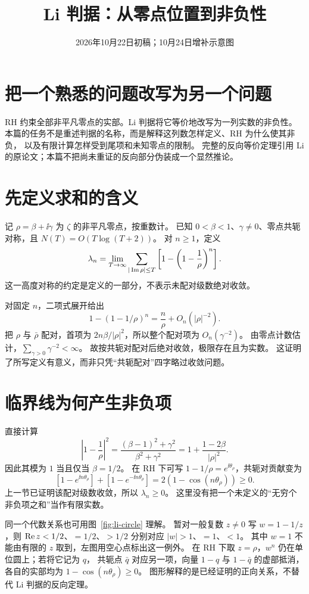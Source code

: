 \documentclass[UTF8,fontset=fandol,11pt]{ctexart}
\date{2026年10月22日初稿；10月24日增补示意图}
\title{Li 判据：从零点位置到非负性}
\begin{document}
\maketitle
\draftnotice
\section{把一个熟悉的问题改写为另一个问题}
RH 约束全部非平凡零点的实部。Li 判据将它等价地改写为一列实数的非负性。
本篇的任务不是重述判据的名称，而是解释这列数怎样定义、RH 为什么使其非负，
以及有限计算怎样受到尾项和未知零点的限制。
完整的反向等价定理引用 Li 的原论文；本篇不把尚未重证的反向部分伪装成一个显然推论。

\section{先定义求和的含义}
记 $\rho=\beta+\ii\gamma$ 为 $\zeta$ 的非平凡零点，按重数计。
已知 $0<\beta<1$、$\gamma\ne0$、零点共轭对称，且 $N(T)=O(T\log(T+2))$。
对 $n\ge1$，定义
\[
 \lambda_n=\lim_{T\to\infty}
 \sum_{|\operatorname{Im}\rho|\le T}
 \left[1-\left(1-\frac1\rho\right)^n\right].
\]
这一高度对称的约定是定义的一部分，不表示未配对级数绝对收敛。

对固定 $n$，二项式展开给出
\[
 1-(1-1/\rho)^n=\frac n\rho+O_n(|\rho|^{-2}).
\]
把 $\rho$ 与 $\bar\rho$ 配对，首项为
$2n\beta/|\rho|^2$，所以整个配对项为 $O_n(\gamma^{-2})$。
由零点计数估计，$\sum_{\gamma>0}\gamma^{-2}<\infty$。
故按共轭对配对后绝对收敛，极限存在且为实数。
这证明了所写定义有意义，而非只凭“共轭配对”四字略过收敛问题。

\section{临界线为何产生非负项}
直接计算
\[
 \left|1-\frac1\rho\right|^2
 =\frac{(\beta-1)^2+\gamma^2}{\beta^2+\gamma^2}
 =1+\frac{1-2\beta}{|\rho|^2}.
\]
因此其模为 $1$ 当且仅当 $\beta=1/2$。
在 RH 下可写 $1-1/\rho=e^{\ii\theta_\rho}$，共轭对贡献变为
\[
 [1-e^{\ii n\theta_\rho}]+[1-e^{-\ii n\theta_\rho}]
 =2(1-\cos(n\theta_\rho))\ge0.
\]
上一节已证明该配对级数收敛，所以 $\lambda_n\ge0$。
这里没有把一个未定义的“无穷个非负项之和”当作有限实数。

\begin{samepage}
同一个代数关系也可用图~\ref{fig:li-circle} 理解。
暂对一般复数 $z\ne0$ 写 $w=1-1/z$，则 $\operatorname{Re} z<1/2$、$=1/2$、$>1/2$
分别对应 $|w|>1$、$=1$、$<1$。
其中 $w=1$ 不能由有限的 $z$ 取到，左图用空心点标出这一例外。
在 RH 下取 $z=\rho$，$w^n$ 仍在单位圆上；若将它记为 $q$，
共轭点 $\bar q$ 对应另一项，向量 $1-q$ 与 $1-\bar q$ 的虚部抵消，
各自的实部均为 $1-\cos(n\theta_\rho)\ge0$。
图形解释的是已经证明的正向关系，不替代 Li 判据的反向定理。
\par
\end{samepage}
\end{document}
